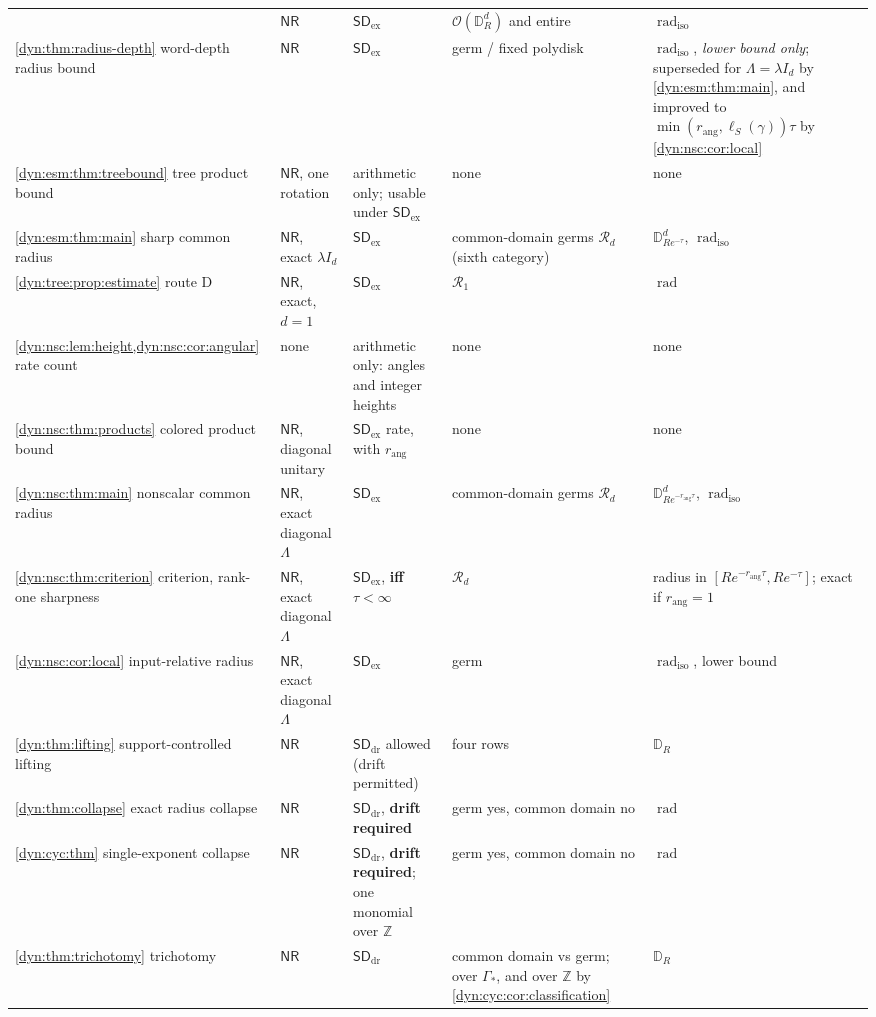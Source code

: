 \documentclass[11pt,letterpaper]{article}
\theoremstyle{definition}
\theoremstyle{remark}
\newcommand{\Z}{\mathbb Z}
\newcommand{\OO}{\mathcal O}
\newcommand{\rad}{\operatorname{rad}}
\newcommand{\radiso}{\operatorname{rad}_{\mathrm{iso}}}
\newcommand{\sddr}{\mathsf{SD}_{\mathrm{dr}}}
\newcommand{\sdex}{\mathsf{SD}_{\mathrm{ex}}}
\newcommand{\nres}{\mathsf{NR}}
\newcommand{\rang}{r_{\mathrm{ang}}}
\numberwithin{equation}{section}
\begin{document}
\begin{longtable}{@{}P{0.24\textwidth}P{0.10\textwidth}P{0.11\textwidth}P{0.22\textwidth}P{0.20\textwidth}@{}}
& $\nres$ & $\sdex$ & $\OO(\mathbb D_R^d)$ and entire & $\radiso$\\
\cref{dyn:thm:radius-depth} word-depth radius bound
& $\nres$ & $\sdex$ & germ / fixed polydisk & $\radiso$, \emph{lower bound
only}; superseded for $\Lambda=\lambda I_d$ by \cref{dyn:esm:thm:main}, and
improved to $\min(\rang,\ell_S(\gamma))\tau$ by \cref{dyn:nsc:cor:local}\\
\cref{dyn:esm:thm:treebound} tree product bound
& $\nres$, one rotation & arithmetic only; usable under $\sdex$ & none
& none\\
\cref{dyn:esm:thm:main} sharp common radius
& $\nres$, exact $\lambda I_d$ & $\sdex$ & common-domain germs
$\mathcal R_d$ (sixth category) & $\mathbb D^{d}_{Re^{-\tau}}$,
$\radiso$\\
\cref{dyn:tree:prop:estimate} route D
& $\nres$, exact, $d=1$ & $\sdex$ & $\mathcal R_1$ & $\rad$\\
\cref{dyn:nsc:lem:height,dyn:nsc:cor:angular} rate count
& none & arithmetic only: angles and integer heights & none & none\\
\cref{dyn:nsc:thm:products} colored product bound
& $\nres$, diagonal unitary & $\sdex$ rate, with $\rang$ & none & none\\
\cref{dyn:nsc:thm:main} nonscalar common radius
& $\nres$, exact diagonal $\Lambda$ & $\sdex$ & common-domain germs
$\mathcal R_d$ & $\mathbb D^{d}_{Re^{-\rang\tau}}$, $\radiso$\\
\cref{dyn:nsc:thm:criterion} criterion, rank-one sharpness
& $\nres$, exact diagonal $\Lambda$ & $\sdex$, \textbf{iff} $\tau<\infty$
& $\mathcal R_d$ & radius in $[Re^{-\rang\tau},Re^{-\tau}]$; exact if
$\rang=1$\\
\cref{dyn:nsc:cor:local} input-relative radius
& $\nres$, exact diagonal $\Lambda$ & $\sdex$ & germ & $\radiso$, lower
bound\\
\cref{dyn:thm:lifting} support-controlled lifting
& $\nres$ & $\sddr$ allowed (drift permitted) & four rows & $\mathbb D_R$\\
\cref{dyn:thm:collapse} exact radius collapse
& $\nres$ & $\sddr$, \textbf{drift required} & germ yes, common domain no & $\rad$\\
\cref{dyn:cyc:thm} single-exponent collapse
& $\nres$ & $\sddr$, \textbf{drift required}; one monomial over $\Z$
& germ yes, common domain no & $\rad$\\
\cref{dyn:thm:trichotomy} trichotomy
& $\nres$ & $\sddr$ & common domain vs germ; over $\Gamma_{*}$, and over
$\Z$ by \cref{dyn:cyc:cor:classification} & $\mathbb D_R$\\

\end{longtable}
\end{document}
